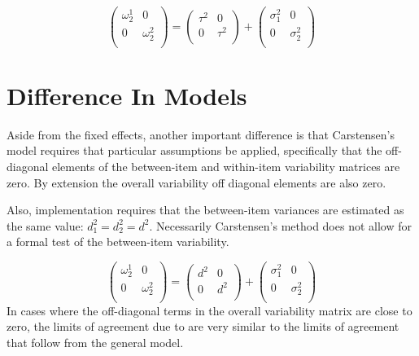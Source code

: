 \documentclass[12pt, a4paper]{report}
\theoremstyle{plain}
\theoremstyle{definition}
\theoremstyle{remark}
\begin{document}
	\[\left(\begin{array}{cc}
	\omega^1_2  & 0 \\
	0 & \omega^2_2 \\
	\end{array}  \right)
	=  \left(
	\begin{array}{cc}
	\tau^2  & 0 \\
	0 & \tau^2 \\
	\end{array} \right)+
	\left(
	\begin{array}{cc}
	\sigma^2_1  & 0 \\
	0 & \sigma^2_2 \\
	\end{array}\right)
	\]
	


\section{Difference In Models}

Aside from the fixed effects, another important difference is that Carstensen's model requires that particular assumptions be applied, specifically that the off-diagonal elements of the between-item and within-item variability matrices are zero. By extension the
overall variability off diagonal elements are also zero.

Also, implementation requires that the between-item variances are estimated as the same value: $d^2_1 = d^2_2 = d^2$. Necessarily
Carstensen's method does not allow for a formal test of the between-item variability.

\[\left(\begin{array}{cc}
\omega^1_2  & 0 \\
0 & \omega^2_2 \\
\end{array}  \right)
=  \left(
\begin{array}{cc}
d^2  & 0 \\
0 & d^2 \\
\end{array} \right)+
\left(
\begin{array}{cc}
\sigma^2_1  & 0 \\
0 & \sigma^2_2 \\
\end{array}\right)
\]
In cases where the off-diagonal terms in the overall variability
matrix are close to zero, the limits of agreement due to \citet{BXC2008} are very similar to the limits of agreement that follow from the general model.
\end{document}
